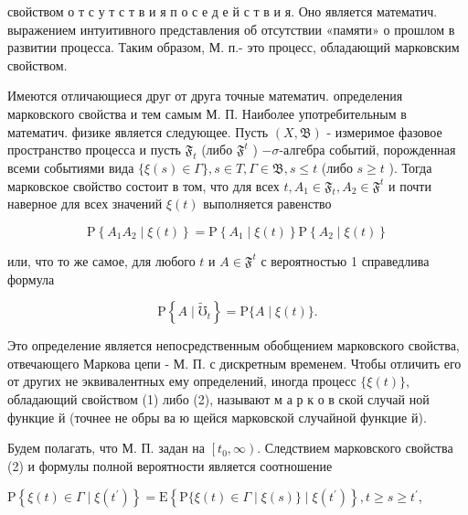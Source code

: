 \documentclass[10pt]{article}
\begin{document}
свойством о т с у т с т в и я п о с е д е й с т в и я. Оно является математич. выражением интуитивного представления об отсутствии «памяти» о прошлом в развитии процесса. Таким образом, М. п.- это процесс, обладающий марковским свойством.



Имеются отличающиеся друг от друга точные математич. определения марковского свойства и тем самым М. П. Наиболее употребительным в математич. физике является следующее. Пусть $(X, \mathfrak{B})$ - измеримое фазовое пространство процесса и пусть $\mathfrak{F}_{t}$ (либо $\mathfrak{F}^{t}$ ) $-\sigma$-алгебра событий, порожденная всеми событиями вида $\{\xi(s) \in \Gamma\}, s \in T, \Gamma \in \mathfrak{B}, s \leqslant t$ (либо $s \geqslant t$ ). Тогда марковское свойство состоит в том, что для всех $t, A_{1} \in \mathfrak{F}_{t}, A_{2} \in \mathfrak{F}^{t}$ и почти наверное для всех значений $\xi(t)$ выполняется равенство



\[

\mathrm{P}\left\{A_{1} A_{2} \mid \xi(t)\right\}=\mathrm{P}\left\{A_{1} \mid \xi(t)\right\} \mathrm{P}\left\{A_{2} \mid \xi(t)\right\}

\]



или, что то же самое, для любого $t$ и $A \in \mathfrak{F}^{t}$ с вероятностью 1 справедлива формула



\[

\mathrm{P}\left\{A \mid \widetilde{\mho}_{t}\right\}=\mathrm{P}\{A \mid \xi(t)\} .

\]



Это определение является непосредственным обобщением марковского свойства, отвечающего Маркова цепи - М. П. с дискретным временем. Чтобы отличить его от других не эквивалентных ему определений, иногда процесс $\{\xi(t)\}$, обладающий свойством (1) либо (2), называют м а р к о в ской случай ной функцие й (точнее не обры ва ю щейся марковской случайной функцие й).



Будем полагать, что М. П. задан на $\left[t_{0}, \infty\right)$. Следствием марковского свойства (2) и формулы полной вероятности является соотношение



$\mathrm{P}\left\{\xi(t) \in \Gamma \mid \xi\left(t^{\prime}\right)\right\}=\mathrm{E}\left\{\mathrm{P}\{\xi(t) \in \Gamma \mid \xi(s)\} \mid \xi\left(t^{\prime}\right)\right\}, t \geqslant s \geqslant t^{\prime}$,
\end{document}

